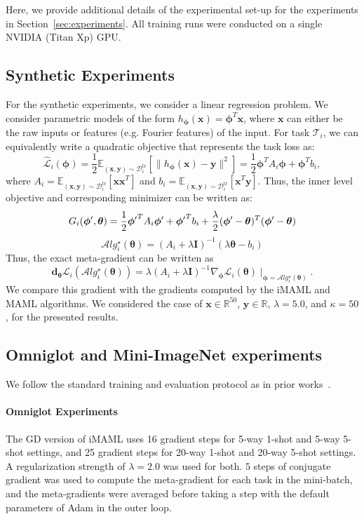\documentclass{article} \usepackage[nonatbib, final]{mod_neurips}
\newcommand{\eye}{\boldsymbol{I}}
\newcommand{\task}{\mathcal{T}}
\newcommand{\data}{\mathcal{D}}
\newcommand{\inp}{\mathbf{x}}
\newcommand{\out}{\mathbf{y}}
\newcommand{\bR}{\mathbb{R}}
\newcommand{\bE}{\mathbb{E}}
\newcommand{\param}{{\bm{\phi}}}               \newcommand{\paramspace}{\Phi}
\newcommand{\prior}{{\bm{\theta}}}               \newcommand{\priorspace}{\Theta}
\newcommand{\fn}{\mathcal{L}}                  \newcommand{\udfn}{\tilde{\fn}}        \newcommand{\fnht}{\hat{\fn}}        \newcommand{\ud}{\alg}
\newcommand{\algstar}{\mathcal{A}lg^\star}
\newcommand{\grad}{\bm{d}}
\newcommand{\pgrad}{\nabla}
\newcommand{\datatr}{\data^{\mathrm{tr}}}
\begin{document}
Here, we provide additional details of the experimental set-up for the experiments in Section~\ref{sec:experiments}. All training runs were conducted on a single NVIDIA (Titan Xp) GPU.

\subsection{Synthetic Experiments}

For the synthetic experiments, we consider a linear regression problem. We consider parametric models of the form $h_\param(\inp) = \param^T \inp$, where $\inp$ can either be the raw inputs or features (e.g. Fourier features) of the input. For task $\task_i$, we can equivalently write a quadratic objective that represents the task loss as:
\[
\fnht_i(\param) = \frac{1}{2} \bE_{(\inp, \out)\sim \datatr_i} \left[ \| h_\param(\inp) - \out \|^2 \right] = \frac{1}{2} \param^T A_i \param + \param^T b_i,
\]
where $A_i = \bE_{(\inp, \out)\sim \datatr_i} \left[ \inp \inp^T \right]$ and $b_i= \bE_{(\inp, \out)\sim \datatr_i} \left[ \inp^T \out \right]$. Thus, the inner level objective and corresponding minimizer can be written as:
\[
G_i(\dparam, \prior) = \frac{1}{2} \dparam^T A_i \dparam + \dparam^T b_i + \frac{\lambda}{2} (\dparam - \prior)^T (\dparam - \prior)
\]
\[
\algstar_i(\prior) = \left( A_i + \lambda \eye \right)^{-1} \left( \lambda \prior - b_i \right) 
\]
Thus, the exact meta-gradient can be written as
\[
\grad_\prior \fn_i(\algstar_i(\prior)) = \lambda (A_i + \lambda \eye)^{-1} \pgrad_\param \fn_i(\prior) \mid_{\param = \algstar_i(\prior)}.
\]
We compare this gradient with the gradients computed by the iMAML and MAML algorithms. We considered the case of $\inp \in \bR^{50}$, $\out \in \bR$, $\lambda=5.0$, and $\kappa=50$, for the presented results.

\subsection{Omniglot and Mini-ImageNet experiments}

We follow the standard training and evaluation protocol as in prior works~\cite{mann, matchingnets, maml}. 

\paragraph{Omniglot Experiments} The GD version of iMAML uses 16 gradient steps for 5-way 1-shot and 5-way 5-shot settings, and 25 gradient steps for 20-way 1-shot and 20-way 5-shot settings. A regularization strength of $\lambda=2.0$ was used for both. $5$ steps of conjugate gradient was used to compute the meta-gradient for each task in the mini-batch, and the meta-gradients were averaged before taking a step with the default parameters of Adam in the outer loop.
\end{document}
